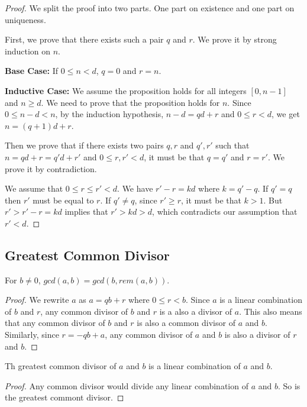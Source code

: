 \documentclass[11pt]{article}
\begin{document}
\begin{proof}
We split the proof into two parts. One part on existence and one part on uniqueness.

First, we prove that there exists such a pair $q$ and $r$. We prove it by strong induction
on $n$.

\textbf{Base Case:} If $0 \leq n < d$, $q = 0$ and $r = n$.

\textbf{Inductive Case:} We assume the proposition holds for all integers $[0,n-1]$ and
$n \geq d$. We need to prove that the proposition holds for $n$. Since $0 \leq n-d < n$,
by the induction hypothesis, $n-d=qd+r$ and $0 \leq r < d$, we get $n=(q+1)d+r$.

Then we prove that if there exists two pairs $q,r$ and $q',r'$ such that $n=qd+r=q'd+r'$
and $0 \leq r,r' < d$, it must be that $q=q'$ and $r=r'$. We prove it by contradiction.

We assume that $0 \leq r \leq r' < d$. We have $r'-r=kd$ where $k = q'-q$. If $q'=q$ then
$r'$ must be equal to $r$. If $q' \neq q$, since $r' \geq r$, it must be that $k > 1$.
But $r' > r'-r=kd$ implies that $r' > kd > d$, which contradicts our assumption that
$r' < d$.

\end{proof}

\subsection{Greatest Common Divisor}

\begin{lemma} \label{lemma:6}
For $b \neq 0$, $gcd(a,b) = gcd(b,rem(a,b))$.
\end{lemma}

\begin{proof}
We rewrite $a$ as $a = qb+r$ where $0 \leq r < b$. Since $a$ is a linear combination of $b$
and $r$, any common divisor of $b$ and $r$ is a also a divisor of $a$. This also means that
any common divisor of $b$ and $r$ is also a common divisor of $a$ and $b$. Similarly, since
$r = -qb+a$, any common divisor of $a$ and $b$ is also a divisor of $r$ and $b$.
\end{proof}

\begin{theorem} \label{theorem:7}
Th greatest common divisor of $a$ and $b$ is a linear combination of $a$ and $b$.
\end{theorem}

\begin{proof}
Any common divisor would divide any linear combination of $a$ and $b$. So is the greatest
commont divisor.
\end{proof}
\end{document}
